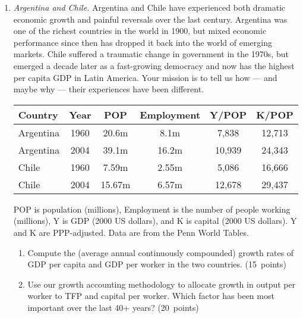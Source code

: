 \documentclass[letterpaper,12pt]{article}
\begin{document}
\begin{enumerate}
\item {\it Argentina and Chile. } 
Argentina and Chile have experienced both dramatic economic growth
and painful reversals over the last century.  
Argentina was one of the richest countries in the world in 1900, 
but mixed economic performance since then has 
dropped it back into the world of emerging markets.  
Chile suffered a traumatic change in government in the 1970s, 
but emerged a decade later as a fast-growing democracy 
and now has the highest per capita GDP in Latin America.  
Your mission is to tell us how --- and maybe why 
--- their experiences have been different.  
%
\begin{center}
\begin{tabular}{lccccc}
\hline\hline
Country   &  Year   &  POP   &  Employment &  Y/POP &  K/POP  \\
\hline\hline
Argentina \hspace*{0.1in} &  1960   &  20.6m &  \phantom{1}8.1m   
                &  \phantom{1}7,838  &  12,713  \\
Argentina &  2004   &  39.1m &  16.2m             &  10,939 &  24,343  \\
Chile   &  1960  & 7.59m &  2.55m   
                &  \phantom{1}5,086   &   16,666  \\
Chile     &  2004   & 15.67m\phantom{1} &  6.57m   &  12,678  &  29,437  \\
\hline\hline
\end{tabular}
\end{center}
POP is population (millions), Employment is the number of people working 
(millions), Y is GDP (2000 US dollars), 
and K is capital (2000 US dollars).  
Y and K are PPP-adjusted.  
Data are from the Penn World Tables.  


\begin{enumerate}
\item Compute the (average annual continuously compounded) 
growth rates of GDP per capita and GDP per worker in the two countries.  (15~points)

\item Use our growth accounting methodology to allocate growth in
output per worker to TFP and capital per worker.
Which factor has been most important over the last 40+ years? (20~points)



\end{enumerate}
\end{enumerate}
\end{document}
